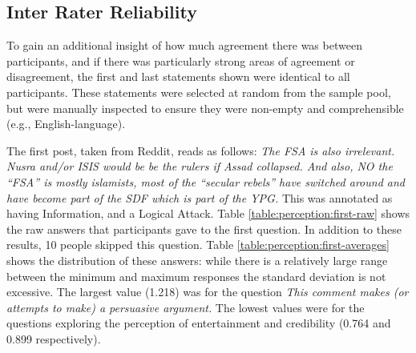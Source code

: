 \subsection{Inter Rater Reliability}
\label{perception:results:interrater}
To gain an additional insight of how much agreement there was between participants, and if there was particularly strong areas of agreement or disagreement, the first and last statements shown were identical to all participants. These statements were selected at random from the sample pool, but were manually inspected to ensure they were non-empty and comprehensible (e.g., English-language).

The first post, taken from Reddit, reads as follows:
\textit{The FSA is also irrelevant. Nusra and/or ISIS would be be the rulers if Assad collapsed. And also, NO the ``FSA'' is mostly islamists, most of the ``secular rebels'' have switched around and have become part of the SDF which is part of the YPG.} This was annotated as having Information, and a Logical Attack. Table \ref{table:perception:first-raw} shows the raw answers that participants gave to the first question. In addition to these results, 10 people skipped this question. Table \ref{table:perception:first-averages} shows the distribution of these answers: while  there is a relatively large range between the minimum and maximum responses the standard deviation is not excessive. The largest value (1.218) was for the question \textit{This comment makes (or attempts to make) a persuasive argument.} The lowest values were for the questions exploring the perception of entertainment and credibility (0.764 and 0.899 respectively).



